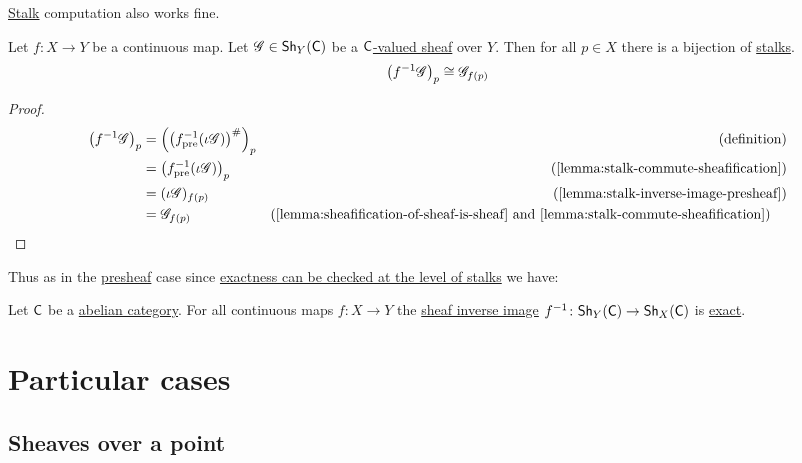 \documentclass[../../main]{subfiles}
\begin{document}
\hyperref[def:stalk]{Stalk} computation also works fine.
\begin{lemma}\label{lemma:stalk-inverse-image}
  Let \(f\colon X \to Y\) be a continuous map.
  Let \(\mathscr{G} \in \mathsf{Sh}_{Y}(\mathsf{C})\) be a \hyperref[def:sheaf]{\(\mathsf{C}\)-valued sheaf} over \(Y\).
  Then for all \(p \in X\) there is a bijection of \hyperref[def:stalk]{stalks}.
  \begin{equation*}
    \left( f^{-1}\mathscr{G} \right)_{p} \cong \mathscr{G}_{f(p)}
  \end{equation*}
\end{lemma}
\begin{proof}
  \begin{align*}
    \left( f^{-1}\sheaf{G} \right)_{p} &= \left( \left( f_{\pre}^{-1}(\iota\sheaf{G}) \right)^{\#} \right)_{p} & \left( \text{definition} \right)\\
                                       &= \left( f_{\pre}^{-1}(\iota\sheaf{G}) \right)_{p} & \left( \text{\autoref{lemma:stalk-commute-sheafification}} \right) \\
                                       &= (\iota\sheaf{G})_{f(p)} & \left( \text{\autoref{lemma:stalk-inverse-image-presheaf}} \right) \\
                                       &= \sheaf{G}_{f(p)} & \left( \text{\autoref{lemma:sheafification-of-sheaf-is-sheaf} and \autoref{lemma:stalk-commute-sheafification}} \right) \quad \qedhere
  \end{align*}
\end{proof}

Thus as in the \hyperref[def:presheaf]{presheaf} case since \hyperref[cor:exactness-at-stalks]{exactness can be checked at the level of stalks} we have:
\begin{corollary}\label{cor:inverse-image-sheaf-exact}
  Let \(\mathsf{C}\) be a \hyperref[def:abelian-category]{abelian category}.
  For all continuous maps \(f: X \to Y\) the \hyperref[def:inverse-image-sheaf]{sheaf inverse image} \(f^{-1}\colon \mathsf{Sh}_{Y}(\mathsf{C}) \to \mathsf{Sh}_{X}(\mathsf{C})\) is \hyperref[def:exact-functor]{exact}.
\end{corollary}

\section{Particular cases}

\subsection{Sheaves over a point}
\end{document}
